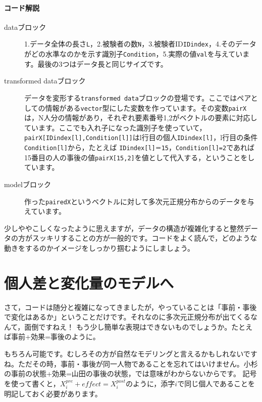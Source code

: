 \documentclass{ltjsbook}
\begin{document}
\paragraph{コード解説}
\begin{description}
	\item[dataブロック] 1.データ全体の長さ\verb|L|，2.被験者の数\verb|N|，3.被験者ID\verb|IDindex|，4.そのデータがどの水準なのかを示す識別子\verb|Condition|，5.実際の値\verb|val|を与えています。最後の3つはデータ長と同じサイズです。
	\item[transformed dataブロック] データを変形する\verb|transformed data|ブロックの登場です。ここではペアとしての情報がある\verb|vector|型にした変数を作っています。その変数\verb|pairX|は，N人分の情報があり，それぞれ要素番号1,2がベクトルの要素に対応しています。ここでも入れ子になった識別子を使っていて，\verb|pairX[IDindex[l],Condition[l]]|はl行目の個人\verb|IDindex[l]|，l行目の条件\verb|Condition[l]|から，たとえば \verb|IDindex[l]＝15|，\verb|Condition[l]=2|であれば15番目の人の事後の値\verb|pairX[15,2]|を値として代入する，ということをしています。
	\item[modelブロック] 作った\verb|pairedX|というベクトルに対して多次元正規分布からのデータを与えています。
\end{description}

少しややこしくなったように思えますが，データの構造が複雑化すると整然データの方がスッキリすることの方が一般的です。コードをよく読んで，どのような動きをするのかイメージをしっかり掴むようにしましょう。

\section{個人差と変化量のモデルへ}
さて，コードは随分と複雑になってきましたが，やっていることは「事前・事後で変化はあるか」ということだけです。それなのに多次元正規分布が出てくるなんて，面倒ですねえ！
もう少し簡単な表現はできないものでしょうか。たとえば事前+効果=事後のように。

もちろん可能です。むしろその方が自然なモデリングと言えるかもしれないですね。ただその時，事前・事後が同一人物であることを忘れてはいけません。小杉の事前の状態+効果=山田の事後の状態，では意味がわからないからです。
記号を使って書くと，$X_i^{pre}+effect = X_i^{post}$のように，添字$i$で同じ個人であることを明記しておく必要があります。
\end{document}

